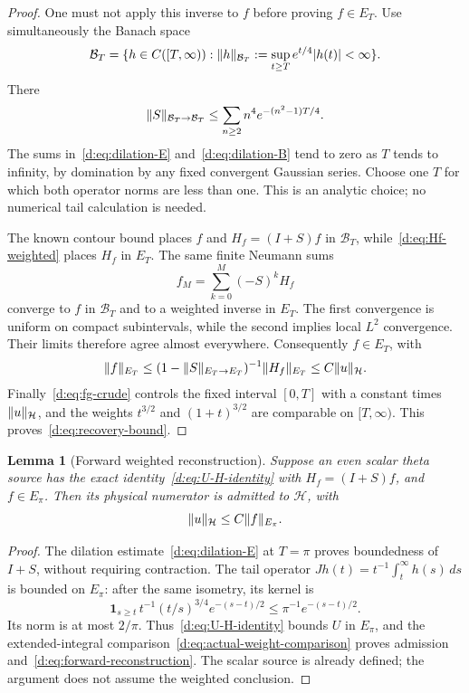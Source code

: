 \documentclass[11pt,a4paper]{article}
\numberwithin{equation}{section}
\newtheorem{lemma}[theorem]{Lemma}
\theoremstyle{definition}\newtheorem{definition}[theorem]{Definition}
\theoremstyle{remark}\newtheorem{remark}[theorem]{Remark}
\newcommand{\Hh}{\mathcal H}\newcommand{\Hw}{\mathcal H}
\begin{document}
\begin{proof}
One must not apply this inverse to $f$ before proving $f\in E_T$. Use simultaneously the Banach space
\[
 \mathcal B_T=\{h\in C([T,\infty)):
       \lVert h\rVert_{\mathcal B_T}:=\sup_{t\ge T}e^{t/4}|h(t)|<\infty\}.
\]
There
\begin{equation}\label{d:eq:dilation-B}
 \lVert S\rVert_{\mathcal B_T\to\mathcal B_T}
 \le\sum_{n\ge2}n^4e^{-(n^2-1)T/4}.
\end{equation}
The sums in~\eqref{d:eq:dilation-E} and~\eqref{d:eq:dilation-B} tend to zero as $T$ tends to infinity, by domination by any fixed convergent Gaussian series. Choose one $T$ for which both operator norms are less than one. This is an analytic choice; no numerical tail calculation is needed.

The known contour bound places $f$ and $H_f=(I+S)f$ in $\mathcal B_T$, while~\eqref{d:eq:Hf-weighted} places $H_f$ in $E_T$. The same finite Neumann sums
\[
 f_M=\sum_{k=0}^M(-S)^kH_f
\]
converge to $f$ in $\mathcal B_T$ and to a weighted inverse in $E_T$. The first convergence is uniform on compact subintervals, while the second implies local $L^2$ convergence. Their limits therefore agree almost everywhere. Consequently $f\in E_T$, with
\[
 \norm{f}_{E_T}\le
 (1-\norm{S}_{E_T\to E_T})^{-1}\norm{H_f}_{E_T}
 \le C\norm{u}_{\Hh}.
\]
Finally~\eqref{d:eq:fg-crude} controls the fixed interval $[0,T]$ with a constant times $\norm{u}_{\Hh}$, and the weights $t^{3/2}$ and $(1+t)^{3/2}$ are comparable on $[T,\infty)$. This proves~\eqref{d:eq:recovery-bound}.
\end{proof}

\begin{lemma}[Forward weighted reconstruction]\label{d:lem:forward-reconstruction}
Suppose an even scalar theta source has the exact identity~\eqref{d:eq:U-H-identity} with $H_f=(I+S)f$, and $f\in E_\pi$. Then its physical numerator is admitted to $\Hh$, with
\begin{equation}\label{d:eq:forward-reconstruction}
 \norm{u}_{\Hh}\le C\norm{f}_{E_\pi}.
\end{equation}
\end{lemma}
\begin{proof}
The dilation estimate~\eqref{d:eq:dilation-E} at $T=\pi$ proves boundedness of $I+S$, without requiring contraction. The tail operator
$Jh(t)=t^{-1}\int_t^\infty h(s)\,ds$ is bounded on $E_\pi$: after the same isometry, its kernel is
\[
 \boldsymbol1_{s\ge t}\,t^{-1}(t/s)^{3/4}e^{-(s-t)/2}
 \le\pi^{-1}e^{-(s-t)/2}.
\]
Its norm is at most $2/\pi$. Thus~\eqref{d:eq:U-H-identity} bounds $U$ in $E_\pi$, and the extended-integral comparison~\eqref{d:eq:actual-weight-comparison} proves admission and~\eqref{d:eq:forward-reconstruction}. The scalar source is already defined; the argument does not assume the weighted conclusion.
\end{proof}
\end{document}

